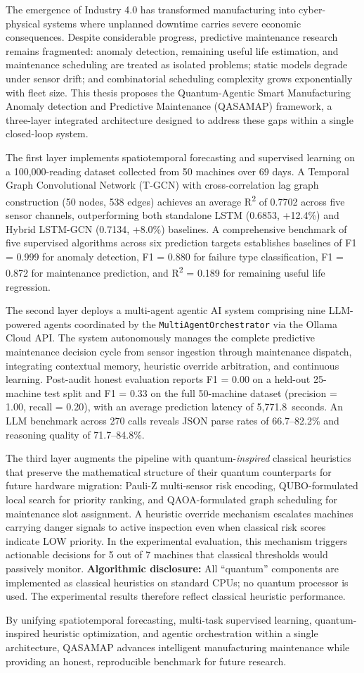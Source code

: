 The emergence of Industry 4.0 has transformed manufacturing into cyber-physical systems where unplanned downtime carries severe economic consequences. Despite considerable progress, predictive maintenance research remains fragmented: anomaly detection, remaining useful life estimation, and maintenance scheduling are treated as isolated problems; static models degrade under sensor drift; and combinatorial scheduling complexity grows exponentially with fleet size. This thesis proposes the Quantum-Agentic Smart Manufacturing Anomaly detection and Predictive Maintenance (QASAMAP) framework, a three-layer integrated architecture designed to address these gaps within a single closed-loop system.

The first layer implements spatiotemporal forecasting and supervised learning on a 100,000-reading dataset collected from 50 machines over 69 days. A Temporal Graph Convolutional Network (T-GCN) with cross-correlation lag graph construction (50 nodes, 538 edges) achieves an average R\textsuperscript{2} of 0.7702 across five sensor channels, outperforming both standalone LSTM (0.6853, +12.4\%) and Hybrid LSTM-GCN (0.7134, +8.0\%) baselines. A comprehensive benchmark of five supervised algorithms across six prediction targets establishes baselines of F1 = 0.999 for anomaly detection, F1 = 0.880 for failure type classification, F1 = 0.872 for maintenance prediction, and R\textsuperscript{2} = 0.189 for remaining useful life regression.

The second layer deploys a multi-agent agentic AI system comprising nine LLM-powered agents coordinated by the \texttt{MultiAgentOrchestrator} via the Ollama Cloud API. The system autonomously manages the complete predictive maintenance decision cycle from sensor ingestion through maintenance dispatch, integrating contextual memory, heuristic override arbitration, and continuous learning. Post-audit honest evaluation reports F1 = 0.00 on a held-out 25-machine test split and F1 = 0.33 on the full 50-machine dataset (precision = 1.00, recall = 0.20), with an average prediction latency of 5,771.8~seconds. An LLM benchmark across 270 calls reveals JSON parse rates of 66.7--82.2\% and reasoning quality of 71.7--84.8\%.

The third layer augments the pipeline with quantum-\emph{inspired} classical heuristics that preserve the mathematical structure of their quantum counterparts for future hardware migration: Pauli-Z multi-sensor risk encoding, QUBO-formulated local search for priority ranking, and QAOA-formulated graph scheduling for maintenance slot assignment. A heuristic override mechanism escalates machines carrying danger signals to active inspection even when classical risk scores indicate LOW priority. In the experimental evaluation, this mechanism triggers actionable decisions for 5 out of 7 machines that classical thresholds would passively monitor. \textbf{Algorithmic disclosure:} All ``quantum'' components are implemented as classical heuristics on standard CPUs; no quantum processor is used. The experimental results therefore reflect classical heuristic performance.

By unifying spatiotemporal forecasting, multi-task supervised learning, quantum-inspired heuristic optimization, and agentic orchestration within a single architecture, QASAMAP advances intelligent manufacturing maintenance while providing an honest, reproducible benchmark for future research.
